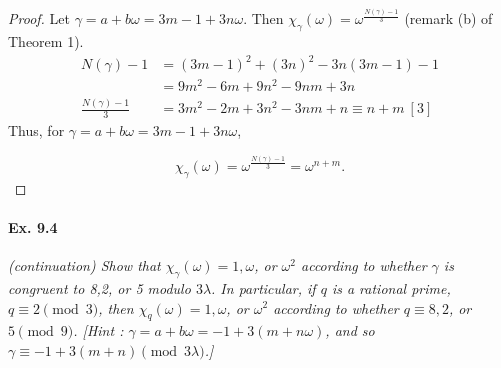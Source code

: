 \documentclass[11pt,a4paper]{article}
\begin{document}
\begin{proof}
Let $\gamma = a+b\omega=3m-1+3n\omega$. Then  $\chi_{\gamma}(\omega) = \omega^{\frac{N(\gamma)-1}{3}}$ (remark (b) of Theorem 1).
\begin{align*}
N(\gamma)-1 &= (3m-1)^2+(3n)^2-3n(3m-1)-1\\
&=9m^2 - 6m + 9n^2 -9nm + 3n\\
\frac{N(\gamma)-1}{3}&= 3m^2-2m+3n^2-3nm+n \equiv n+m \ [3]
\end{align*}
Thus, for $\gamma = a+b\omega=3m-1+3n\omega$,

$$\chi_{\gamma}(\omega) = \omega^{\frac{N(\gamma)-1}{3}} = \omega^{n+m}.$$
\end{proof}

\paragraph{Ex. 9.4}

{\it (continuation) Show that $\chi_\gamma(\omega) = 1,\omega$, or $\omega^2$ according to whether $\gamma$ is congruent to 8,2, or 5 modulo $3\lambda$. In particular, if $q$ is a rational prime, $q \equiv 2 \pmod 3$, then $\chi_q(\omega) = 1, \omega$, or $\omega^2$ according to whether $q \equiv 8,2$, or $5\pmod 9$. [Hint : $\gamma = a + b \omega = -1 + 3(m+n\omega)$, and so $\gamma \equiv -1 + 3(m+n) \pmod{3\lambda}$.]
}
\end{document}
